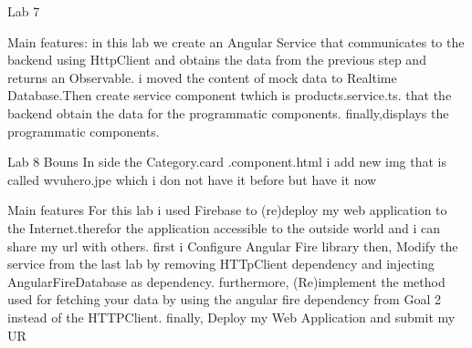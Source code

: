Lab 7

Main features:
in this lab we create an Angular Service that communicates to the backend using HttpClient and obtains the data from the previous step and returns an Observable. 
i moved the content of mock data to Realtime Database.Then create service component twhich  is products.service.ts. that the backend obtain the data for the programmatic components.
finally,displays the programmatic components.



Lab 8
 Bouns 
 In side the Category.card .component.html i add new img that is called wvuhero.jpe which i don not have it before but have it now 

 Main features
 For this lab i used Firebase to (re)deploy my web application to the Internet.therefor the application accessible to the outside world and i can share my url with others.
first i Configure Angular Fire library then, Modify the service from the last lab by removing HTTpClient dependency and injecting AngularFireDatabase as dependency.
furthermore, (Re)implement the method used for fetching your data by using the angular fire dependency from Goal 2 instead of the HTTPClient.
finally,  Deploy my Web Application and submit my UR